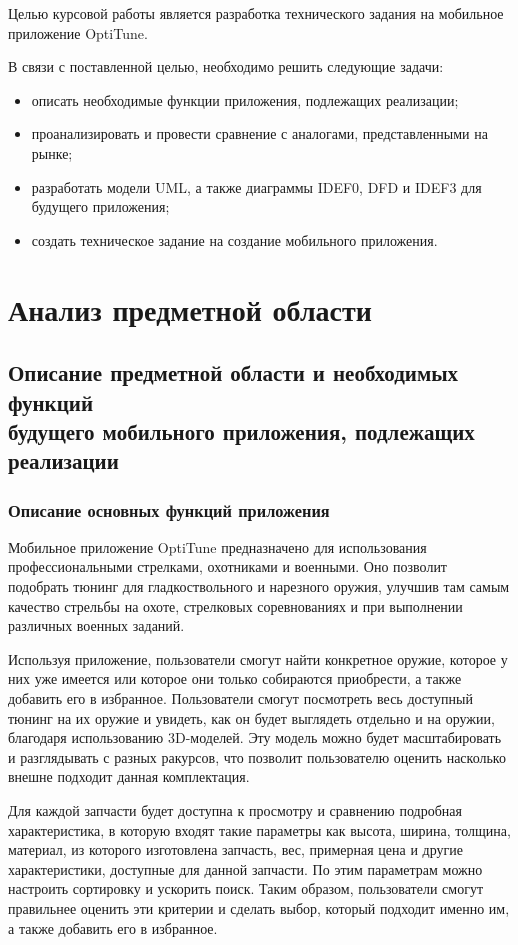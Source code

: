 \documentclass[14pt]{extreport}
\begin{document}
Целью курсовой работы является разработка технического задания на мобильное приложение OptiTune.

В связи с поставленной целью, необходимо решить следующие задачи:
\begin{itemize}
	\item описать необходимые функции приложения, подлежащих реализации;
	\item проанализировать и провести сравнение с аналогами, представленными на рынке;
	\item разработать модели UML, а также диаграммы IDEF0, DFD и IDEF3 для будущего приложения;
	\item создать техническое задание на создание мобильного приложения.
\end{itemize}

\chapter{Анализ предметной области}
\section{Описание предметной области и необходимых функций \\
будущего мобильного приложения, подлежащих реализации}

\subsection{Описание основных функций приложения}

Мобильное приложение OptiTune предназначено для использования профессиональными стрелками, охотниками и военными. Оно позволит подобрать тюнинг для гладкоствольного и нарезного оружия, улучшив там самым качество стрельбы на охоте, стрелковых соревнованиях и при выполнении различных военных заданий.

Используя приложение, пользователи смогут найти конкретное оружие, которое у них уже имеется или которое они только собираются приобрести, а также добавить его в избранное. Пользователи смогут посмотреть весь доступный тюнинг на их оружие и увидеть, как он будет выглядеть отдельно и на оружии, благодаря использованию 3D-моделей. Эту модель можно будет масштабировать и разглядывать с разных ракурсов, что позволит пользователю оценить насколько внешне подходит данная комплектация.

Для каждой запчасти будет доступна к просмотру и сравнению подробная характеристика, в которую входят такие параметры как высота, ширина, толщина, материал, из которого изготовлена запчасть, вес, примерная цена и другие характеристики, доступные для данной запчасти. По этим параметрам можно настроить сортировку и ускорить поиск. Таким образом, пользователи смогут правильнее оценить эти критерии и сделать выбор, который подходит именно им, а также добавить его в избранное.
\end{document}
